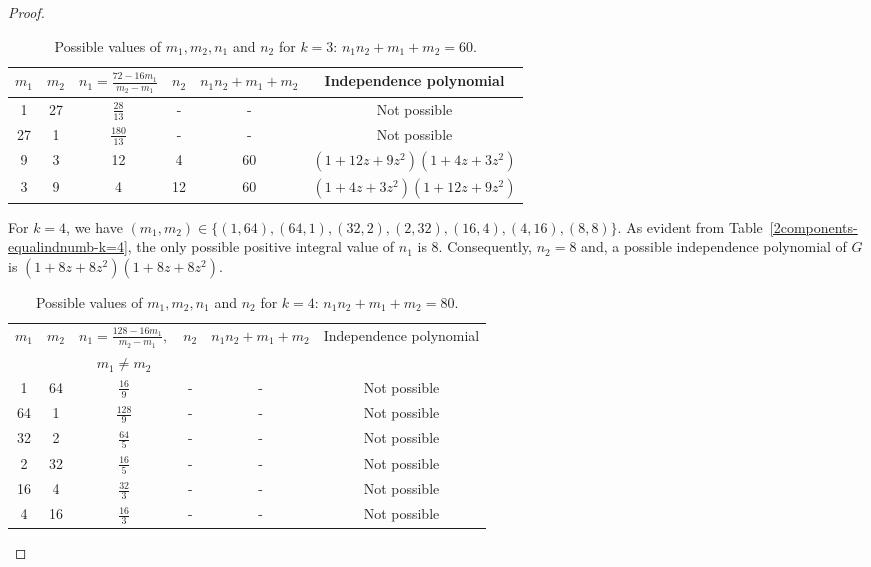 \documentclass[12pt,a4paper]{article}
\theoremstyle{plain}
\numberwithin{equation}{section}
\begin{document}
\begin{proof}
\begin{enumerate}
\begin{table}[h!]
\centering
    \caption{Possible values of $m_1, m_2, n_1$ and $n_2$ for $k=3$: $ n_1 n_2 +m_1 +m_2 =60$.}
    \begin{tabular}{|c|c|c|c|c|c|}
    \hline
      $m_1$ & $m_2$ & $n_1 =\frac{72- 16 m_1}{m_2 -m_1}$ & $n_2$ & $n_1n_2 + m_1 + m_2$ & Independence  polynomial \\
 
      \hline
       1 & 27 & $\frac{28}{13}$ & - & - & Not possible\\ [0.25cm]\hline
       27 & 1 & $\frac{180}{13}$ & - & - & Not possible\\ [0.25cm] \hline
       9 & 3 & 12 & 4  & 60 & $(1+12z+9z^2)(1+4z+3z^2)$\\ \hline
       3 & 9 & 4 & 12 & 60 & $(1+4z+3z^2)(1+12z+9z^2)$\\\hline
      \end{tabular}
    \label{2components-equalindnumb-k=3}
\end{table}
\FloatBarrier
 \par For $k = 4$, we have $(m_1, m_2) \in \{(1, 64), (64,1), (32,2), (2,32), (16,4), (4,16), (8,8)\}$. As evident from Table~\ref{2components-equalindnumb-k=4}, the only possible positive integral value of $n_1$ is $8$. Consequently,  $n_2 =8$ and, a possible independence polynomial of \(G\) is $(1+8z+8z^2)(1+8z+8z^2)$.
\begin{table}[h!]
\centering
    \caption{Possible values of $m_1, m_2, n_1$ and $n_2$ for $k=4$: $n_1n_2 + m_1 +m_2 =80$.}
    \begin{tabular}{|c|c|c|c|c|c|}
    \hline
      $m_1$ & $m_2$ & $n_1 =\frac{128-16 m_1}{m_2 -m_1}, $ & $n_2$ & $n_1n_2 + m_1 +m_2$ & Independence polynomial \\
          &   & $  m_1 \neq m_2 $ &   &   &  \\
      \hline
       1 & 64 & $\frac{16}{9}$ & - & - & Not possible\\ [0.25cm] \hline
       64 & 1 & $\frac{128}{9}$ & - & - & Not possible\\ [0.25cm] \hline
       32 & 2 & $\frac{64}{5}$ & - & - & Not possible\\ [0.25cm] \hline
       2 & 32 & $\frac{16}{5}$ & - & - & Not possible\\ [0.25cm] \hline
       16 & 4 & $\frac{32}{3}$ & - & - & Not possible\\ [0.25cm] \hline
       4 & 16 & $\frac{16}{3}$ & - & - & Not possible\\ [0.25cm] \hline

\end{tabular}
\end{table}
\end{enumerate}
\end{proof}
\end{document}
